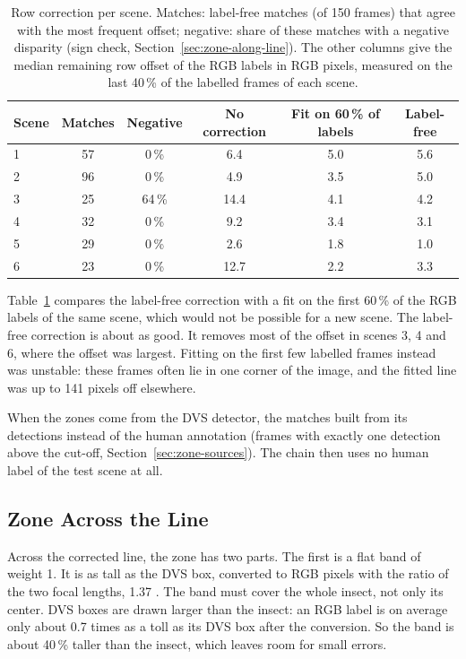 \begin{table}[ht]
    \centering
    \caption{Row correction per scene. Matches: label-free matches (of 150 frames)
    that agree with the most frequent offset; negative: share of these matches with
    a negative disparity (sign check, Section~\ref{sec:zone-along-line}). The other
    columns give the median remaining row offset of the RGB labels in RGB pixels,
    measured on the last 40\,\% of the labelled frames of each scene.}
    \label{tab:row-correction}
    \small
    \begin{tabular}{lccccc}
        \hline
        Scene & Matches & Negative & No correction & Fit on 60\,\% of labels & Label-free \\
        \hline
        1 & 57 & 0\,\% & 6.4 & 5.0 & 5.6 \\
        2 & 96 & 0\,\% & 4.9 & 3.5 & 5.0 \\
        3 & 25 & 64\,\% & 14.4 & 4.1 & 4.2 \\
        4 & 32 & 0\,\% & 9.2 & 3.4 & 3.1 \\
        5 & 29 & 0\,\% & 2.6 & 1.8 & 1.0 \\
        6 & 23 & 0\,\% & 12.7 & 2.2 & 3.3 \\
        \hline
    \end{tabular}
\end{table}

Table~\ref{tab:row-correction} compares the label-free correction with a fit on the first 60\,\% of the RGB 
labels of the same scene, which would not be possible for a new scene. The label-free correction is about as 
good. It removes most of the offset in scenes 3, 4 and 6, where the offset was largest. Fitting on the first few 
labelled frames instead was unstable: these frames often lie in one corner of the image, and the fitted line was
up to 141 pixels off elsewhere.

When the zones come from the DVS detector, the matches built from its detections instead of the human annotation
(frames with exactly one detection above the cut-off, Section~\ref{sec:zone-sources}). The chain then uses no 
human label of the test scene at all.

\subsection{Zone Across the Line}
\label{sec:zone-across-line}

Across the corrected line, the zone has two parts. The first is a flat band of weight 1. It is as tall as the DVS
box, converted to RGB pixels with the ratio of the two focal lengths, 1.37 \parencite{hartley_multiple_2003}. 
The band must cover the whole insect, not only its center. DVS boxes are drawn larger than the insect: an RGB 
label is on average only about 0.7 times as a toll as its DVS box after the conversion. So the band is about 
40\,\% taller than the insect, which leaves room for small errors.

